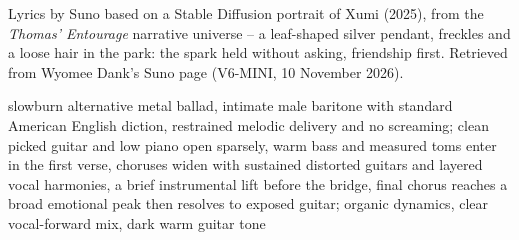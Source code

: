 
\label{sec:you-are-beautiful}
\begin{notes}
Lyrics by Suno based on a Stable Diffusion portrait of Xumi (2025), from the \emph{Thomas' Entourage} narrative universe -- a leaf-shaped silver pendant, freckles and a loose hair in the park: the spark held without asking, friendship first. Retrieved from Wyomee Dank's Suno page (V6-MINI, 10 November 2026).
\end{notes}
\begin{style}
slowburn alternative metal ballad, intimate male baritone with standard American English diction, restrained melodic delivery and no screaming; clean picked guitar and low piano open sparsely, warm bass and measured toms enter in the first verse, choruses widen with sustained distorted guitars and layered vocal harmonies, a brief instrumental lift before the bridge, final chorus reaches a broad emotional peak then resolves to exposed guitar; organic dynamics, clear vocal-forward mix, dark warm guitar tone
\end{style}
